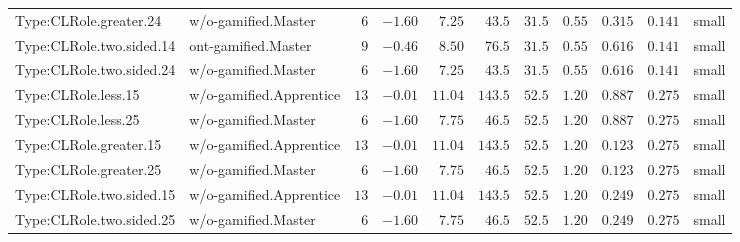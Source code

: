 \documentclass[6pt,a4paper]{article}
\begin{document}
{\begin{longtable}{llrrrrrrrrl}
Type:CLRole.greater.24&w/o-gamified.Master&$ 6$&$-1.60$&$ 7.25$&$ 43.5$&$ 31.5$&$ 0.55$&$0.315$&$0.141$&small\tabularnewline
Type:CLRole.two.sided.14&ont-gamified.Master&$ 9$&$-0.46$&$ 8.50$&$ 76.5$&$ 31.5$&$ 0.55$&$0.616$&$0.141$&small\tabularnewline
Type:CLRole.two.sided.24&w/o-gamified.Master&$ 6$&$-1.60$&$ 7.25$&$ 43.5$&$ 31.5$&$ 0.55$&$0.616$&$0.141$&small\tabularnewline
Type:CLRole.less.15&w/o-gamified.Apprentice&$13$&$-0.01$&$11.04$&$143.5$&$ 52.5$&$ 1.20$&$0.887$&$0.275$&small\tabularnewline
Type:CLRole.less.25&w/o-gamified.Master&$ 6$&$-1.60$&$ 7.75$&$ 46.5$&$ 52.5$&$ 1.20$&$0.887$&$0.275$&small\tabularnewline
Type:CLRole.greater.15&w/o-gamified.Apprentice&$13$&$-0.01$&$11.04$&$143.5$&$ 52.5$&$ 1.20$&$0.123$&$0.275$&small\tabularnewline
Type:CLRole.greater.25&w/o-gamified.Master&$ 6$&$-1.60$&$ 7.75$&$ 46.5$&$ 52.5$&$ 1.20$&$0.123$&$0.275$&small\tabularnewline
\newpage
Type:CLRole.two.sided.15&w/o-gamified.Apprentice&$13$&$-0.01$&$11.04$&$143.5$&$ 52.5$&$ 1.20$&$0.249$&$0.275$&small\tabularnewline
Type:CLRole.two.sided.25&w/o-gamified.Master&$ 6$&$-1.60$&$ 7.75$&$ 46.5$&$ 52.5$&$ 1.20$&$0.249$&$0.275$&small\tabularnewline
\hline
\end{longtable}}
\end{document}
